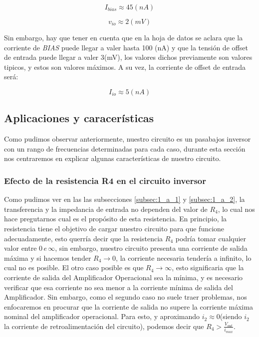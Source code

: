 \[
I_{bias}\approx45(nA)
\]
 
\[
v_{io}\approx2(mV)
\]

Sin embargo, hay que tener en cuenta que en la hoja de datos se aclara
que la corriente de \emph{BIAS} puede llegar a valer hasta 100 (nA)
y que la tensión de offset de entrada puede llegar a valer 3(mV),
los valores dichos previamente son valores tipicos, y estos son valores
máximos. A su vez, la corriente de offset de entrada será:

\[
I_{io}\approx5(nA)
\]

\subsection{Aplicaciones y caracerísticas}

Como pudimos observar anteriormente, nuestro circuito es un pasabajos
inversor con un rango de frecuencias determinadas para cada caso,
durante esta sección nos centraremos en explicar algunas características
de nuestro circuito.

\subsubsection{Efecto de la resistencia R4 en el circuito inversor}

Como pudimos ver en las las subsecciones \ref{subsec:1_a_1} y \ref{subsec:1_a_2},
la transferencia y la impedancia de entrada no dependen del valor
de $R_{4}$, lo cual nos hace pregutarnos cual es el propósito de
esta resistencia. En principio, la resistencia tiene el objetivo de
cargar nuestro circuito para que funcione adecuadamente, esto querría
decir que la resistencia $R_{4}$ podría tomar cualquier valor entre
$0\,e\,\infty$, sin embargo, nuestro circuito presenta una corriente
de salida máxima y si hacemos tender $R_{4}\longrightarrow0$, la
corriente necesaria tendería a infinito, lo cual no es posible. El
otro caso posible es que $R_{4}\longrightarrow\infty$, esto significaria
que la corriente de salida del Amplificador Operacional sea la mínima,
y es necesario verificar que esa corriente no sea menor a la corriente
mínima de salida del Amplificador. Sin embargo, como el segundo caso
no suele traer problemas, nos enfocaremos en procurar que la corriente
de salida no supere la corriente máxima nominal del amplificador operacional.
Para esto, y aproximando $i_{2}\approx0$(siendo $i_{2}$ la corriente
de retroalimentación del circuito), podemos decir que $R_{4}>\frac{V_{out}}{i_{max}}$.

